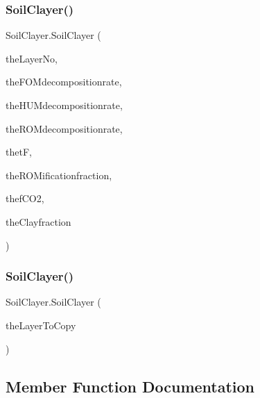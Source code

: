 \subsubsection{\texorpdfstring{SoilClayer()}{SoilClayer()}\hspace{0.1cm}{\footnotesize\ttfamily [1/2]}}
{\footnotesize\ttfamily Soil\+Clayer.\+Soil\+Clayer (\begin{DoxyParamCaption}\item[{int}]{the\+Layer\+No,  }\item[{double}]{the\+F\+O\+Mdecompositionrate,  }\item[{double}]{the\+H\+U\+Mdecompositionrate,  }\item[{double}]{the\+R\+O\+Mdecompositionrate,  }\item[{double}]{thetF,  }\item[{double}]{the\+R\+O\+Mificationfraction,  }\item[{double}]{thef\+C\+O2,  }\item[{double}]{the\+Clayfraction }\end{DoxyParamCaption})\hspace{0.3cm}{\ttfamily [inline]}}

\mbox{\label{class_soil_clayer_af6c5d1771dfa373500e42dad9e2afd9a}} 
\subsubsection{\texorpdfstring{SoilClayer()}{SoilClayer()}\hspace{0.1cm}{\footnotesize\ttfamily [2/2]}}
{\footnotesize\ttfamily Soil\+Clayer.\+Soil\+Clayer (\begin{DoxyParamCaption}\item[{\mbox{\hyperlink{class_soil_clayer}{Soil\+Clayer}}}]{the\+Layer\+To\+Copy }\end{DoxyParamCaption})\hspace{0.3cm}{\ttfamily [inline]}}



\subsection{Member Function Documentation}
\mbox{\label{class_soil_clayer_ad4ff61d6fc320884f78f259399baa800}} 
